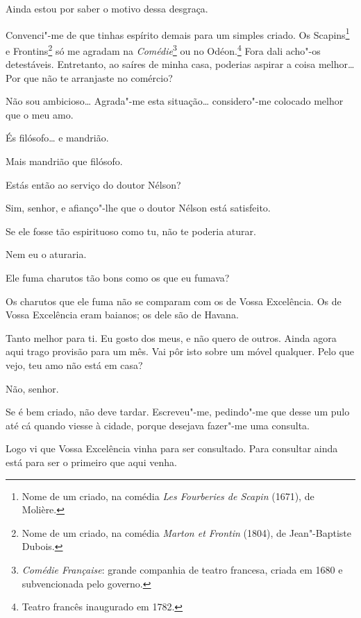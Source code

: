   Ainda estou por saber o motivo dessa desgraça.

  Convenci"-me de que tinhas espírito demais para um
simples criado. Os Scapins\footnote{ Nome de um criado, na comédia \textit{Les Fourberies de Scapin} (1671), de Molière.} 
e Frontins\footnote{ Nome de um criado, na comédia \textit{Marton et Frontin} (1804), de Jean"-Baptiste Dubois.} 
só me agradam na \textit{Comédie}\footnote{ \textit{Comédie Française}: 
grande companhia de teatro francesa, criada em 1680 e subvencionada pelo governo.}
ou no Odéon.\footnote{
Teatro francês inaugurado em 1782.}
Fora dali acho"-os detestáveis. Entretanto, ao saíres de
minha casa, poderias aspirar a coisa melhor\ldots{} Por que não te
arranjaste no comércio?

  Não sou ambicioso\ldots{} Agrada"-me esta situação\ldots{} considero"-me
colocado melhor que o meu amo.

  És filósofo\ldots{} e mandrião.

  Mais mandrião que filósofo.

  Estás então ao serviço do doutor Nélson?

  Sim, senhor, e afianço"-lhe que o doutor Nélson está satisfeito.

  Se ele fosse tão espirituoso como tu, não te
poderia aturar.

  Nem eu o aturaria.

  Ele fuma charutos tão bons como os que eu fumava?

  Os charutos que ele fuma não se comparam com os de Vossa
Excelência. Os de Vossa Excelência eram baianos; os dele são de Havana.

  Tanto melhor para ti. Eu gosto dos meus, e não
quero de outros.  Ainda agora aqui trago
provisão para um mês.  Vai pôr isto sobre um
móvel qualquer.  Pelo que vejo, teu amo não está em casa?

  Não, senhor.

  Se é bem criado, não deve tardar. Escreveu"-me,
pedindo"-me que desse um pulo até cá quando viesse à cidade, porque
desejava fazer"-me uma consulta.

  Logo vi que Vossa Excelência vinha para ser consultado.
Para consultar ainda está para ser o primeiro que aqui venha.

